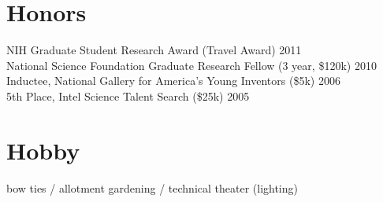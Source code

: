 \documentclass[margin]{res}
\newcommand{\nblocdatesubsection}[3]{#1 (#2) \hfill #3 }
\newcommand{\nbdatesubsection}[2]{#1 \hfill #2 }
\begin{document}
\begin{sloppypar}
\begin{resume}


\section{Honors}
\nblocdatesubsection{NIH Graduate Student Research Award}{Travel Award}{2011} \\
\nblocdatesubsection{National Science Foundation Graduate Research Fellow}{3 year, \$120k}{2010} \\
\nblocdatesubsection{Inductee, National Gallery for America's Young Inventors}{\$5k}{2006} \\
\nblocdatesubsection{5th Place, Intel Science Talent Search}{\$25k}{2005}

\section{Hobby}
bow ties / allotment gardening / technical theater (lighting)



\end{resume} 
\end{sloppypar}
\end{document}
